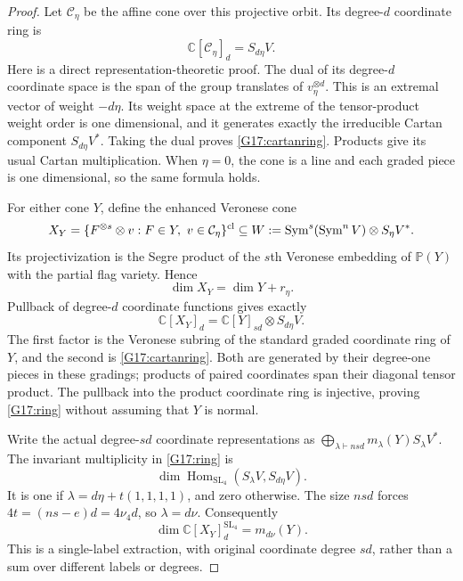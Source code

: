 \documentclass[11pt,a4paper]{article}
\theoremstyle{definition}\newtheorem{definition}{Definition}
\begin{document}
\begin{proof}
Let $\mathcal C_\eta$ be the affine cone over this projective orbit.
Its degree-$d$ coordinate ring is
\begin{equation}\label{G17:cartanring}
 \mathbb C[\mathcal C_\eta]_d=S_{d\eta}V.
\end{equation}
Here is a direct representation-theoretic proof. The dual of its
degree-$d$ coordinate space is the span of the group translates of
$v_\eta^{\otimes d}$. This is an extremal vector of weight $-d\eta$.
Its weight space at the extreme of the tensor-product weight order
is one dimensional, and it generates exactly the irreducible Cartan
component $S_{d\eta}V^*$. Taking the dual proves
\eqref{G17:cartanring}. Products give its usual Cartan multiplication.
When $\eta=0$, the cone is a line and each graded piece is
one dimensional, so the same formula holds.

For either cone $Y$, define the enhanced Veronese cone
\begin{equation}\label{G17:enhancement}
 X_Y=\{F^{\otimes s}\otimes v:F\in Y,\ v\in\mathcal C_\eta\}^{\rm cl}
 \subseteq W:=\operatorname{Sym}^s(\operatorname{Sym}^n V)
                      \otimes S_\eta V^*.
\end{equation}
Its projectivization is the Segre product of the $s$th Veronese
embedding of $\mathbb P(Y)$ with the partial flag variety. Hence
\begin{equation}\label{G17:dimension}
 \dim X_Y=\dim Y+r_\eta.
\end{equation}
Pullback of degree-$d$ coordinate functions gives exactly
\begin{equation}\label{G17:ring}
 \mathbb C[X_Y]_d=\mathbb C[Y]_{sd}\otimes S_{d\eta}V.
\end{equation}
The first factor is the Veronese subring of the standard graded
coordinate ring of $Y$, and the second is \eqref{G17:cartanring}.
Both are generated by their degree-one pieces in these gradings;
products of paired coordinates span their diagonal tensor product.
The pullback into the product coordinate ring is injective, proving
\eqref{G17:ring} without assuming that $Y$ is normal.

Write the actual degree-$sd$ coordinate representations as
$\bigoplus_{\lambda\vdash nsd}m_\lambda(Y)S_\lambda V^*$.
The invariant multiplicity in \eqref{G17:ring} is
\[
 \dim\operatorname{Hom}_{\mathrm{SL}_4}
                   (S_\lambda V,S_{d\eta}V).
\]
It is one if $\lambda=d\eta+t(1,1,1,1)$, and zero otherwise.
The size $nsd$ forces
$4t=(ns-e)d=4\nu_4d$, so $\lambda=d\nu$.
Consequently
\begin{equation}\label{G17:extraction}
 \dim\mathbb C[X_Y]_d^{\mathrm{SL}_4}=m_{d\nu}(Y).
\end{equation}
This is a single-label extraction, with original coordinate degree
$sd$, rather than a sum over different labels or degrees.


\end{proof}
\end{document}
